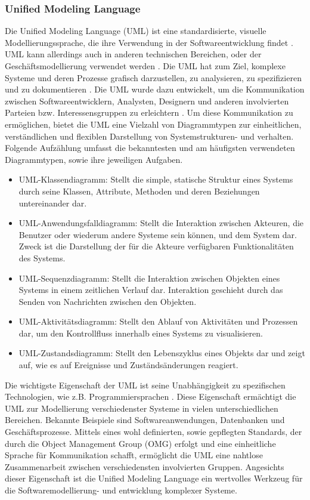 \subsubsection{Unified Modeling Language}
\label{sec3:model:subsubsec:uml}
Die Unified Modeling Language (UML) \cite{omg-uml} ist eine standardisierte, visuelle Modellierungssprache, die ihre Verwendung in der Softwareentwicklung findet \cite{visual-paradigm-uml}.
UML kann allerdings auch in anderen technischen Bereichen, oder der Geschäftsmodellierung verwendet werden \cite{Kreische2004}.
Die UML hat zum Ziel, komplexe Systeme und deren Prozesse grafisch darzustellen, zu analysieren, zu spezifizieren und zu dokumentieren \cite{visual-paradigm-uml}.
Die UML wurde dazu entwickelt, um die Kommunikation zwischen Softwareentwicklern, Analysten, Designern und anderen involvierten Parteien bzw. Interessensgruppen zu erleichtern \cite{visual-paradigm-uml}.
Um diese Kommunikation zu ermöglichen, bietet die UML eine Vielzahl von Diagrammtypen zur einheitlichen, verständlichen und flexiblen Darstellung von Systemstrukturen- und verhalten.
Folgende Aufzählung umfasst die bekanntesten und am häufigsten verwendeten Diagrammtypen, sowie ihre jeweiligen Aufgaben.
\begin{itemize}
    \item UML-Klassendiagramm: Stellt die simple, statische Struktur eines Systems durch seine Klassen, Attribute, Methoden und deren Beziehungen untereinander dar.
    \item UML-Anwendungsfalldiagramm: Stellt die Interaktion zwischen Akteuren, die Benutzer oder wiederum andere Systeme sein können, und dem System dar.
    Zweck ist die Darstellung der für die Akteure verfügbaren Funktionalitäten des Systems.
    \item UML-Sequenzdiagramm: Stellt die Interaktion zwischen Objekten eines Systems in einem zeitlichen Verlauf dar.
    Interaktion geschieht durch das Senden von Nachrichten zwischen den Objekten.
    \item UML-Aktivitätsdiagramm: Stellt den Ablauf von Aktivitäten und Prozessen dar, um den Kontrollfluss innerhalb eines Systems zu visualisieren.
    \item UML-Zustandsdiagramm: Stellt den Lebenszyklus eines Objekts dar und zeigt auf, wie es auf Ereignisse und Zuständsänderungen reagiert.
\end{itemize}
Die wichtigste Eigenschaft der UML ist seine Unabhängigkeit zu spezifischen Technologien, wie z.B. Programmiersprachen \cite{ibm-uml}.
Diese Eigenschaft ermächtigt die UML zur Modellierung verschiedenster Systeme in vielen unterschiedlichen Bereichen.
Bekannte Beispiele sind Softwareanwendungen, Datenbanken und Geschäftsprozesse.
Mittels eines wohl definierten, sowie gepflegten Standards, der durch die Object Management Group (OMG) \cite{omg} erfolgt und eine einheitliche Sprache für Kommunikation schafft, ermöglicht die UML eine nahtlose Zusammenarbeit zwischen verschiedensten involvierten Gruppen.
Angesichts dieser Eigenschaft ist die Unified Modeling Language ein wertvolles Werkzeug für die Softwaremodellierung- und entwicklung komplexer Systeme.

